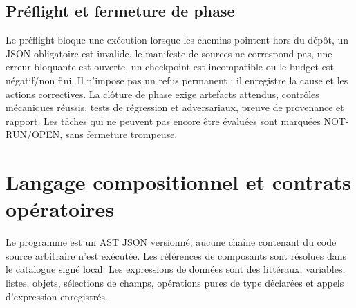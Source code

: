 \documentclass[10pt,a4paper]{article}
\begin{document}
\subsection{Préflight et fermeture de phase}
Le préflight bloque une exécution lorsque les chemins pointent hors du dépôt, un JSON obligatoire est invalide, le manifeste de sources ne correspond pas, une erreur bloquante est ouverte, un checkpoint est incompatible ou le budget est négatif/non fini. Il n'impose pas un refus permanent : il enregistre la cause et les actions correctives. La clôture de phase exige artefacts attendus, contrôles mécaniques réussis, tests de régression et adversariaux, preuve de provenance et rapport. Les tâches qui ne peuvent pas encore être évaluées sont marquées NOT-RUN/OPEN, sans fermeture trompeuse.

\section{Langage compositionnel et contrats opératoires}
Le programme est un AST JSON versionné; aucune chaîne contenant du code source arbitraire n'est exécutée. Les références de composants sont résolues dans le catalogue signé local. Les expressions de données sont des littéraux, variables, listes, objets, sélections de champs, opérations pures de type déclarées et appels d'expression enregistrés.
\end{document}
